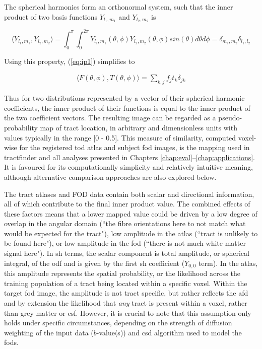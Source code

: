 The spherical harmonics form an orthonormal system, such that the inner product of two basis functions $Y_{l_1,m_1}$ and $Y_{l_2,m_2}$ is

\begin{equation}
  \langle Y_{l_1,m_1}, Y_{l_2,m_2} \rangle
    = \int_0^{\pi} \int_0^{2\pi} Y_{l_1,m_1}(\theta, \phi) Y_{l_2,m_2}(\theta, \phi) sin(\theta) d\theta d\phi
    = \delta_{m_1, m_2} \delta_{l_1, l_2}
\end{equation}

Using this property, (\ref{eq:ip1}) simplifies to

\begin{align}
  \langle F(\theta, \phi), T(\theta, \phi) \rangle = \sum_{k,j} f_j t_k \delta_{jk}
\end{align}\label{eq:ip2}

Thus for two distributions represented by a vector of their spherical harmonic coefficients, the inner product of their functions is equal to the inner product of the two coefficient vectors.
The resulting image can be regarded as a pseudo-probability map of tract location, in arbitrary and dimensionless units with values typically in the range [0 - 0.5].
This measure of similarity, computed voxel-wise for the registered \gls{tod} atlas and subject \gls{fod} images, is the mapping used in tractfinder and all analyses presented in Chapters \ref{chap:eval}--\ref{chap:applications}.
It is favoured for its computationally simplicity and relatively intuitive meaning, although alternative comparison approaches are also explored below.

The tract atlases and FOD data contain both scalar and directional information, all of which contribute to the final inner product value.
The combined effects of these factors means that a lower mapped value could be driven by a low degree of overlap in the angular domain (``the fibre orientations here to not match what would be expected for the tract"), low amplitude in the atlas (``tract is unlikely to be found here"), or low amplitude in the \gls{fod} (``there is not much white matter signal here").
In \gls{sh} terms, the scalar component is total amplitude, or spherical integral, of the \gls{odf} and is given by the first \gls{sh} coefficient ($Y_{0,0}$ term).
In the atlas, this amplitude represents the spatial probability, or the likelihood across the training population of a tract being located within a specific voxel.
Within the target \gls{fod} image, the amplitude is not tract specific, but rather reflects the \gls{afd} and by extension the likelihood that \textit{any} tract is present within a voxel, rather than grey matter or \gls{csf}.
However, it is crucial to note that this assumption only holds under specific circumstances, depending on the strength of diffusion weighting of the input data ($b$-value(s)) and \gls{csd} algorithm used to model the \glspl{fod}.

